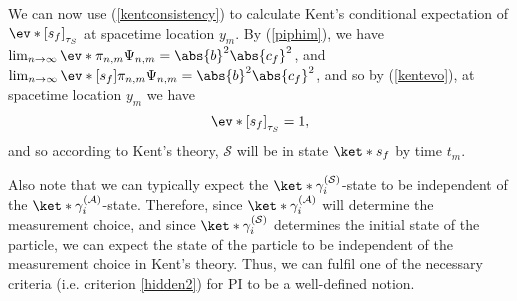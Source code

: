 \documentclass[12pt]{report}
\begin{document}
We can now use (\ref{kentconsistency}) to calculate Kent's conditional expectation of $\ev*{[s_f]}_{\tau_S}$ at spacetime location $y_m$. By (\ref{piphim}), we have  $\lim_{n\rightarrow\infty}\ev*{\pi_{n,m}}{\Psi_{n,m}}=\abs{b}^2 \abs{c_f}^2 $, and $\lim_{n\rightarrow\infty}\ev*{[s_f] \pi_{n,m}}{\Psi_{n,m}}=\abs{b}^2 \abs{c_f}^2 $, and so by (\ref{kentevo}), at spacetime location $y_m$ we have
$$ \ev*{[s_f]}_{\tau_S}=1,$$
and so according to Kent's theory, $\mathcal{S}$ will be in state $\ket*{s_f}$ by time $t_m$.

Also note that we can typically expect the $\ket*{\gamma_i^{(\mathcal{S})}}$-state to be independent of the $\ket*{\gamma_i^{(\mathcal{A})}}$-state. Therefore, since $\ket*{\gamma_i^{(\mathcal{A})}}$ will determine the measurement choice, and since $\ket*{\gamma_i^{(\mathcal{S})}}$ determines the initial state of the particle, we can expect the state of the particle to be independent of the measurement choice in Kent's theory. Thus, we can fulfil one of the necessary criteria (i.e. criterion \ref{hidden2}) for PI to be a well-defined notion.
\end{document}
